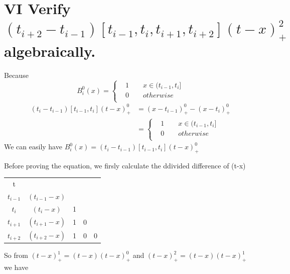 \documentclass[twoside,a4paper]{article}
\begin{document}
\section*{VI \small{Verify $\left( t_{i+2}-t_{i-1} \right)[t_{i-1},t_{i},t_{i+1},t_{i+2}]\left( t-x \right)_{+}^{2}  $ algebraically.}}

Because
$$ B^{0}_{i}\left( x \right)=\left\{
        \begin{aligned}
		&1\qquad x∈(t_{i-1},t_{i}]\\
                &0\qquad otherwise\\
        \end{aligned}
\right.$$
\begin{equation*}
	\begin{split}
		\left( t_{i}-t_{i-1} \right)[t_{i-1},t_{i}]\left( t-x \right)_{+}^{0}
		&=\left( x-t_{i-1} \right)_{+}^{0}-\left( x-t_{i} \right)_{+}^{0}\\
		&=\left\{
			\begin{aligned}
				&1\qquad x\in (t_{i-1},t_{i}]\\
				&0\qquad otherwise\\
			\end{aligned}
		\right.
	\end{split}
\end{equation*}
We can easily have $B_{i}^{0}\left( x \right)=\left( t_{i}-t_{i-1} \right)[t_{i-1},t_{i}]\left( t-x \right)^{0}_{+}$

Before proving the equation, we firsly calculate the ddivided difference of (t-x)

\begin{tabular}{c|cccc}
t\\
$t_{i-1}$&$\left( t_{i-1}-x \right)$ & \\
$t_{i}$  &$\left( t_{i}-x \right) $  &1&\\
$t_{i+1}$&$\left( t_{i+1}-x \right)$ &1&0&\\
$t_{i+2}$&$\left( t_{i+2}-x \right)$ &1&0&0\\
\end{tabular}

So from $\left( t-x \right)_{+}^{1}=\left( t-x \right)\left( t-x \right)_{+}^{0}$ and 
$\left( t-x \right)_{+}^{2}=\left(t-x  \right)\left( t-x \right)_{+}^{1}  $ we have
\end{document}
